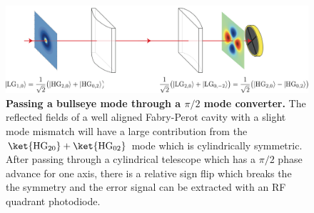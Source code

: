 \begin{figure}[h]
	\centering
	\includegraphics[width=1.0 \textwidth]{../Figures/ModeConv.png}
	\caption[Passing a bullseye mode through a $\pi/2$ mode converter.]
	{\textbf{Passing a bullseye mode through a $\pi/2$ mode converter.} The reflected fields of a well aligned Fabry-Perot cavity with a slight mode mismatch will have a large contribution from the $\ket{\text{HG}_{20}} + \ket{\text{HG}_{02}}$ mode which is cylindrically symmetric.  After passing through a cylindrical telescope which has a $\pi/2$ phase advance for one axis, there is a relative sign flip which breaks the the symmetry and the error signal can be extracted with an RF quadrant photodiode.
	}
	\label{fig:ModeConv}
\end{figure}